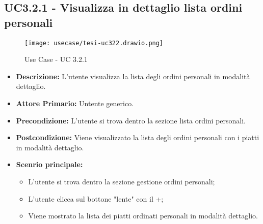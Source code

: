\subsection{UC3.2.1 - Visualizza in dettaglio lista ordini personali}
\begin{figure}[H]
    \centering
    \texttt{[image: usecase/tesi-uc322.drawio.png]}
    \caption{Use Case - UC 3.2.1}
\end{figure}
\begin{itemize}
    \item \textbf{Descrizione:} L'utente visualizza la lista degli ordini personali in modalità dettaglio.
    \item \textbf{Attore Primario:} Untente generico.
    \item \textbf{Precondizione:} L'utente si trova dentro la sezione lista ordini personali.
    \item \textbf{Postcondizione:} Viene visualizzato la lista degli ordini personali con i piatti in modalità dettaglio.
    \item \textbf{Scenrio principale:}
    \begin{itemize}
        \item L'utente si trova dentro la sezione gestione ordini personali;
        \item L'utente clicca sul bottone "lente" con il +;
        \item Viene mostrato la lista dei piatti ordinati personali in modalità dettaglio.
    \end{itemize}
\end{itemize}
